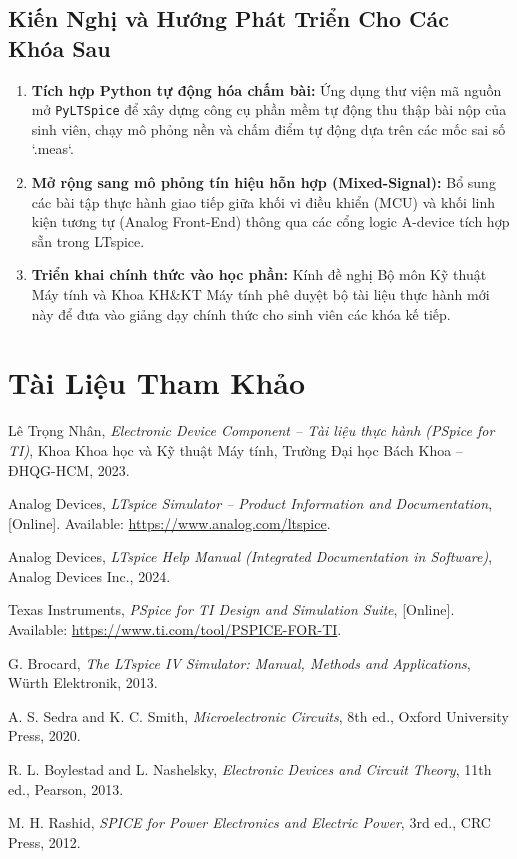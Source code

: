 \documentclass[12pt,a4paper]{report}
\begin{document}
\section{Kiến Nghị và Hướng Phát Triển Cho Các Khóa Sau}
\begin{enumerate}
    \item \textbf{Tích hợp Python tự động hóa chấm bài:} Ứng dụng thư viện mã nguồn mở \texttt{PyLTSpice} để xây dựng công cụ phần mềm tự động thu thập bài nộp của sinh viên, chạy mô phỏng nền và chấm điểm tự động dựa trên các mốc sai số `.meas`.
    \item \textbf{Mở rộng sang mô phỏng tín hiệu hỗn hợp (Mixed-Signal):} Bổ sung các bài tập thực hành giao tiếp giữa khối vi điều khiển (MCU) và khối linh kiện tương tự (Analog Front-End) thông qua các cổng logic A-device tích hợp sẵn trong LTspice.
    \item \textbf{Triển khai chính thức vào học phần:} Kính đề nghị Bộ môn Kỹ thuật Máy tính và Khoa KH\&KT Máy tính phê duyệt bộ tài liệu thực hành mới này để đưa vào giảng dạy chính thức cho sinh viên các khóa kế tiếp.
\end{enumerate}

\chapter*{Tài Liệu Tham Khảo}

\begin{enumerate}[label={[\arabic*]},leftmargin=2.5cm]
    \item Lê Trọng Nhân, \textit{Electronic Device Component -- Tài liệu thực hành (PSpice for TI)}, Khoa Khoa học và Kỹ thuật Máy tính, Trường Đại học Bách Khoa -- ĐHQG-HCM, 2023.
    \item Analog Devices, \textit{LTspice Simulator -- Product Information and Documentation}, [Online]. Available: \url{https://www.analog.com/ltspice}.
    \item Analog Devices, \textit{LTspice Help Manual (Integrated Documentation in Software)}, Analog Devices Inc., 2024.
    \item Texas Instruments, \textit{PSpice for TI Design and Simulation Suite}, [Online]. Available: \url{https://www.ti.com/tool/PSPICE-FOR-TI}.
    \item G. Brocard, \textit{The LTspice IV Simulator: Manual, Methods and Applications}, Würth Elektronik, 2013.
    \item A. S. Sedra and K. C. Smith, \textit{Microelectronic Circuits}, 8th ed., Oxford University Press, 2020.
    \item R. L. Boylestad and L. Nashelsky, \textit{Electronic Devices and Circuit Theory}, 11th ed., Pearson, 2013.
    \item M. H. Rashid, \textit{SPICE for Power Electronics and Electric Power}, 3rd ed., CRC Press, 2012.
\end{enumerate}
\end{document}
